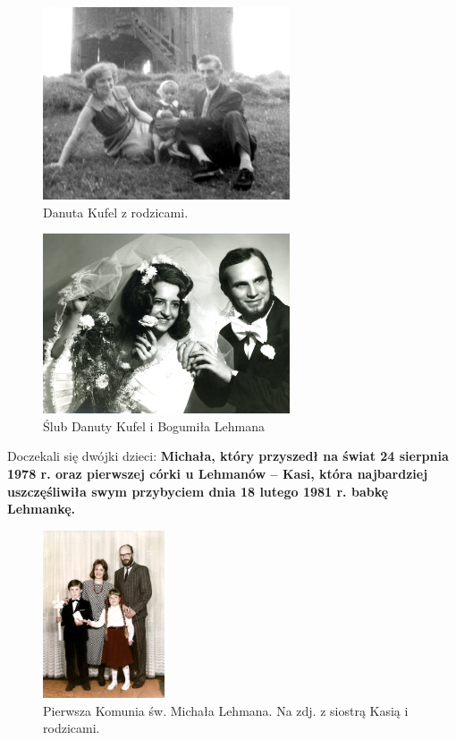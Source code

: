 \begin{figure}[!h]
\begin{center}
\includegraphics[width=0.65\textwidth]{photo/danuta_kufel.jpg}
\caption{Danuta Kufel z rodzicami.}
\end{center}
\end{figure}

\begin{figure}[!h]
\begin{center}
\includegraphics[width=0.65\textwidth]{photo/bogumil_danuta_lehman_slub.jpg}
\caption{Ślub Danuty Kufel i Bogumiła Lehmana}
\end{center}
\end{figure}

Doczekali się dwójki dzieci: \textbf{Michała, który przyszedł na świat 24 sierpnia 1978 r. oraz pierwszej córki u Lehmanów -- Kasi, która najbardziej uszczęśliwiła swym przybyciem dnia 18 lutego 1981 r. babkę Lehmankę.}

\begin{figure}[!h]
\begin{center}
\includegraphics[width=0.32\textwidth]{photo/michal_lehman_komunia.jpg}
\caption[Pierwsza Komunia św. Michała Lehmana]{Pierwsza Komunia św. Michała Lehmana. Na zdj. z  siostrą Kasią i rodzicami.}
\end{center}
\end{figure}

